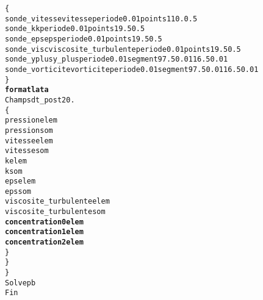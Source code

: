 \begin{alltt}
        \{
            sonde_vitesse vitesse periode 0.01 points 1 10. 0.5
            sonde_k k periode 0.01 points 1 9.5 0.5
            sonde_eps eps periode 0.01 points 1 9.5 0.5
            sonde_visc viscosite_turbulente periode 0.01 points 1 9.5 0.5
            sonde_yplus y_plus periode 0.01 segment 9 7.5 0.01 16.5 0.01
            sonde_vorticite vorticite periode 0.01 segment 9 7.5 0.01 16.5 0.01
        \}
        {\bf{format lata}}
        Champs dt_post 20.
        \{
            pression elem
            pression som
            vitesse elem
            vitesse som
            k elem
            k som
            eps elem
            eps som
            viscosite_turbulente elem
            viscosite_turbulente som
            {\bf{concentration0 elem}}
            {\bf{concentration1 elem}}
            {\bf{concentration2 elem}}
        \}
    \}
\}
Solve pb
Fin
\end{alltt}
